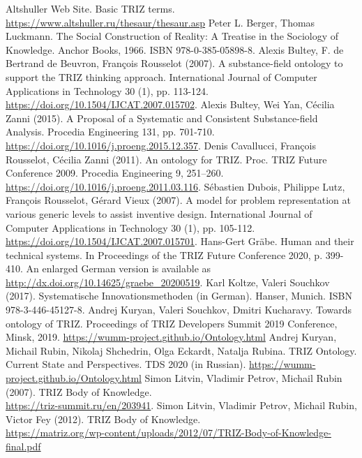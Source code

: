 \documentclass[11pt,a4paper]{article}
\begin{document}
\begin{thebibliography}{xxx}
  \raggedright
{} Altshuller Web Site. Basic TRIZ terms.
  \url{https://www.altshuller.ru/thesaur/thesaur.asp}
 Peter L. Berger, Thomas Luckmann. The Social
  Construction of Reality: A Treatise in the Sociology of Knowledge. Anchor
  Books, 1966. ISBN 978-0-385-05898-8.
 Alexis Bultey, F. de Bertrand de Beuvron, Fran\c{c}ois
  Rousselot (2007). A substance-field ontology to support the TRIZ thinking
  approach. International Journal of Computer Applications in Technology 30
  (1), pp. 113-124.  \url{https://doi.org/10.1504/IJCAT.2007.015702}.
 Alexis Bultey, Wei Yan, Cécilia Zanni (2015). A Proposal
  of a Systematic and Consistent Substance-field Analysis. Procedia
  Engineering 131, pp. 701-710.
  \url{https://doi.org/10.1016/j.proeng.2015.12.357}.
 Denis Cavallucci, Fran\c{c}ois Rousselot, Cécilia
  Zanni (2011). An ontology for TRIZ. Proc. TRIZ Future Conference 2009.
  Procedia Engineering 9, 251–260.
  \url{https://doi.org/10.1016/j.proeng.2011.03.116}.
 Sébastien Dubois, Philippe Lutz, Fran\c{c}ois Rousselot,
  Gérard Vieux (2007).  A model for problem representation at various generic
  levels to assist inventive design. International Journal of Computer
  Applications in Technology 30 (1), pp. 105-112.
  \url{https://doi.org/10.1504/IJCAT.2007.015701}.
 Hans-Gert Gr\"abe. Human and their technical systems.  In
  Proceedings of the TRIZ Future Conference 2020, p. 399-410.  An enlarged
  German version is available as
  \url{http://dx.doi.org/10.14625/graebe_20200519}. 
 Karl Koltze, Valeri Souchkov (2017).  Systematische
  Innovationsmethoden (in German).  Hanser, Munich. ISBN 978-3-446-45127-8.
 Andrej Kuryan, Valeri Souchkov, Dmitri Kucharavy. Towards
  ontology of TRIZ. Proceedings of TRIZ Developers Summit 2019 Conference,
  Minsk, 2019.  \url{https://wumm-project.github.io/Ontology.html}
 Andrej Kuryan, Michail Rubin, Nikolaj Shchedrin, Olga
  Eckardt, Natalja Rubina.  TRIZ Ontology. Current State and Perspectives. TDS
  2020 (in Russian).  \url{https://wumm-project.github.io/Ontology.html}
 Simon Litvin, Vladimir Petrov, Michail Rubin (2007). TRIZ
  Body of Knowledge. \\ \url{https://triz-summit.ru/en/203941}.
 Simon Litvin, Vladimir Petrov, Michail Rubin, Victor Fey
  (2012). TRIZ Body of
  Knowledge. \\ \url{https://matriz.org/wp-content/uploads/2012/07/TRIZ-Body-of-Knowledge-final.pdf}

\end{thebibliography}
\end{document}

